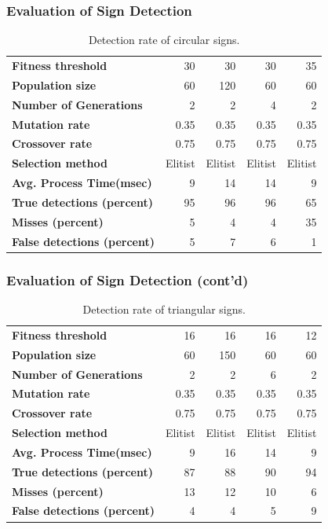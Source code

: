 \documentclass{beamer}
\begin{document}
\begin{frame}
	\frametitle{Evaluation of Sign Detection} 
	\begin{table}[ht]
	\centering
	\caption{Detection rate of circular signs.}
	\label{signdetect-table-1}
	{\footnotesize
	\begin{tabular}{|l r r r r|}
		\hline
		\textbf{Fitness threshold} 		& 30 & 30 & 30 & 35 \\
		\textbf{Population size} 			& 60 & 120 & 60 & 60 \\
		\textbf{Number of Generations} 	& 2 & 2 & 4 & 2 \\
		\textbf{Mutation rate}     		& 0.35 & 0.35 & 0.35 & 0.35 \\
		\textbf{Crossover rate} 				& 0.75 & 0.75 & 0.75 & 0.75 \\
		\textbf{Selection method} 				& Elitist & Elitist & Elitist & Elitist \\
		\hline
		\textbf{Avg. Process Time(msec)}	& 9 & 14 & 14 & 9 \\
		\textbf{True detections (percent)} &  95 &  96 &  96 &  65 \\
		\textbf{Misses (percent)}	&  5 &  4 &  4 &  35 \\
		\hline
		\textbf{False detections (percent)}				&  5 &  7 &  6 &  1 \\
		\hline
	\end{tabular}
	}
	\end{table}	
\end{frame}

\begin{frame}
	\frametitle{Evaluation of Sign Detection (cont'd)} 
	\begin{table}[ht]
	\centering
	\caption{Detection rate of triangular signs.}
	\label{signdetect-table-2}
	{\footnotesize
	\begin{tabular}{|l r r r r|}
	\hline
	\textbf{Fitness threshold} 		& 16 & 16 & 16 & 12 \\
	\textbf{Population size} 			& 60 & 150 & 60 & 60 \\
	\textbf{Number of Generations} 	& 2 & 2 & 6 & 2 \\
	\textbf{Mutation rate}     		& 0.35 & 0.35 & 0.35 & 0.35 \\
	\textbf{Crossover rate} 				& 0.75 & 0.75 & 0.75 & 0.75 \\
	\textbf{Selection method} 				& Elitist & Elitist & Elitist & Elitist \\
	\hline
	\textbf{Avg. Process Time(msec)}			& 9 & 16 & 14 & 9 \\
	\textbf{True detections (percent)}				& 87 & 88 & 90 & 94 \\
	\textbf{Misses (percent)}				&  13 & 12 & 10 & 6 \\
	\hline
	\textbf{False detections (percent)}				&  4 &  4 &  5 &  9 \\
	\hline
	\end{tabular}
	}
	\end{table}
\end{frame}
\end{document}
